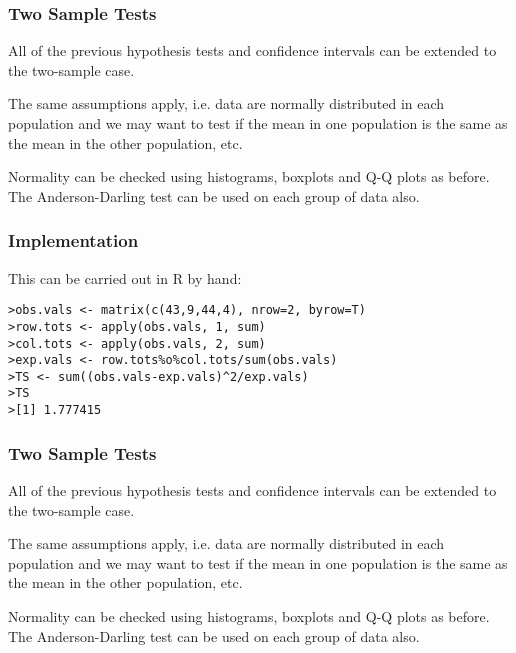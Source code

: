

\subsubsection{Two Sample Tests}


All of the previous hypothesis tests and confidence intervals can be
extended to the two-sample case.

The same assumptions apply, i.e. data are normally distributed in
each population and we may want to test if the mean in one
population is the same as the mean in the other population, etc.

Normality can be checked using histograms, boxplots and Q-Q
plots as before. The Anderson-Darling test can be used on
each group of data also.


\subsubsection{Implementation}

This can be carried out in R by hand:

\footnotesize \begin{verbatim}
>obs.vals <- matrix(c(43,9,44,4), nrow=2, byrow=T)
>row.tots <- apply(obs.vals, 1, sum)
>col.tots <- apply(obs.vals, 2, sum)
>exp.vals <- row.tots%o%col.tots/sum(obs.vals)
>TS <- sum((obs.vals-exp.vals)^2/exp.vals)
>TS
>[1] 1.777415
\end{verbatim}\normalsize





\subsubsection{Two Sample Tests}


All of the previous hypothesis tests and confidence intervals can be
extended to the two-sample case.

The same assumptions apply, i.e. data are normally distributed in
each population and we may want to test if the mean in one
population is the same as the mean in the other population, etc.

Normality can be checked using histograms, boxplots and Q-Q
plots as before. The Anderson-Darling test can be used on
each group of data also.


